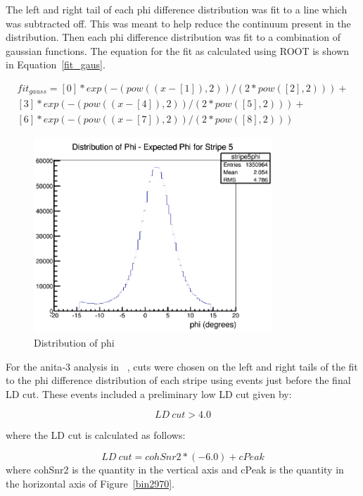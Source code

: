 The left and right tail of each phi difference distribution was fit to a line which was subtracted off. This was meant to help reduce the continuum present in the distribution. Then each phi difference distribution was fit to a combination of gaussian functions. The equation for the fit as calculated using ROOT is shown in Equation~\ref{fit_gaus}. 

\begin{multline}
fit_{gauss} = [0]*exp(-(pow((x-[1]),2))/(2*pow([2],2))) + \\ [3]*exp(-(pow((x-[4]),2))/(2*pow([5],2))) + \\
[6]*exp(-(pow((x-[7]),2))/(2*pow([8],2))) 
\label{fit_gaus}
\end{multline}

\begin{figure}
\centering
\includegraphics[width=0.8\textwidth]{figures/phi_dist_thesis.png}
\caption{Distribution of phi }
\label{phidist}
\end{figure}

For the \gls{anita}-3 analysis in ~\cite{diffuse,jacobGordonThesis}, cuts were chosen on the left and right tails of the fit to the phi difference distribution of each stripe using events just before the final LD cut. These events included a preliminary low LD cut given by: 

\begin{equation}
LD~cut > 4.0
\end{equation}

where the LD cut is calculated as follows:

\begin{equation}
LD~cut = cohSnr2 * (-6.0 ) + cPeak
\end{equation}
where cohSnr2 is the quantity in the vertical axis and cPeak is the quantity in the horizontal axis of Figure~\ref{bin2970}.


